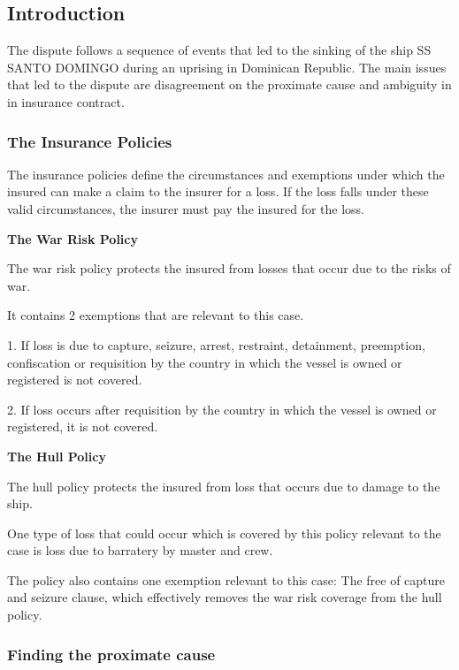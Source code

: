 \subsection{Introduction}

The dispute follows a sequence of events that led to the sinking of the ship SS SANTO DOMINGO during an uprising in Dominican Republic.
The main issues that led to the dispute are disagreement on the proximate cause and ambiguity in in insurance contract.


\subsubsection{The Insurance Policies}

The insurance policies define the circumstances and exemptions under which the insured can make a claim to the insurer for a loss. If the loss falls under these valid circumstances, the insurer must pay the insured for the loss.

\textbf{The War Risk Policy}

The war risk policy protects the insured from losses that occur due to the risks of war.

It contains 2 exemptions that are relevant to this case.

1. If loss is due to capture, seizure, arrest, restraint, detainment, preemption, confiscation or requisition by the country in which the vessel is owned or registered is not covered.

2. If loss occurs after requisition by the country in which the vessel is owned or registered, it is not covered.

\textbf{The Hull Policy}

The hull policy protects the insured from loss that occurs due to damage to the ship.

One type of loss that could occur which is covered by this policy relevant to the case is loss due to barratery by master and crew.

The policy also contains one exemption relevant to this case: The free of capture and seizure clause, which effectively removes the war risk coverage from the hull policy.  

\subsubsection{Finding the proximate cause}

